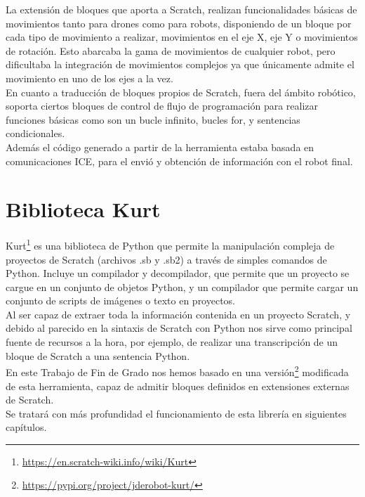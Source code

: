 La extensión de bloques que aporta a Scratch, realizan funcionalidades básicas de movimientos tanto para drones como para robots, disponiendo de un bloque por cada tipo de movimiento a realizar, movimientos en el eje X, eje Y o movimientos de rotación. Esto abarcaba la gama de movimientos de cualquier robot, pero dificultaba la integración de movimientos complejos ya que únicamente admite el movimiento en uno de los ejes a la vez.\\

En cuanto a traducción de bloques propios de Scratch, fuera del ámbito robótico, soporta ciertos bloques de control de flujo de programación para realizar funciones básicas como son un bucle infinito, bucles for, y sentencias condicionales.\\

Además el código generado a partir de la herramienta estaba basada en comunicaciones ICE, para el envió y obtención de información con el robot final.\\

\section{Biblioteca Kurt}
\label{sec:kurt}
Kurt\footnote{\url{https://en.scratch-wiki.info/wiki/Kurt}} es una biblioteca de Python que permite la manipulación compleja de proyectos de Scratch (archivos .sb y .sb2) a través de simples comandos de Python. Incluye un compilador y decompilador, que permite que un proyecto se cargue en un conjunto de objetos Python, y un compilador que permite cargar un conjunto de scripts de imágenes o texto en proyectos.\\

Al ser capaz de extraer toda la información contenida en un proyecto Scratch, y debido al parecido en la sintaxis de Scratch con Python nos sirve como principal fuente de recursos a la hora, por ejemplo, de realizar una transcripción de un bloque de Scratch a una sentencia Python.\\

En este Trabajo de Fin de Grado nos hemos basado en una versión\footnote{\url{https://pypi.org/project/jderobot-kurt/}} modificada de esta herramienta, capaz de admitir bloques definidos en extensiones externas de Scratch.\\

Se tratará con más profundidad el funcionamiento de esta librería en siguientes capítulos.




